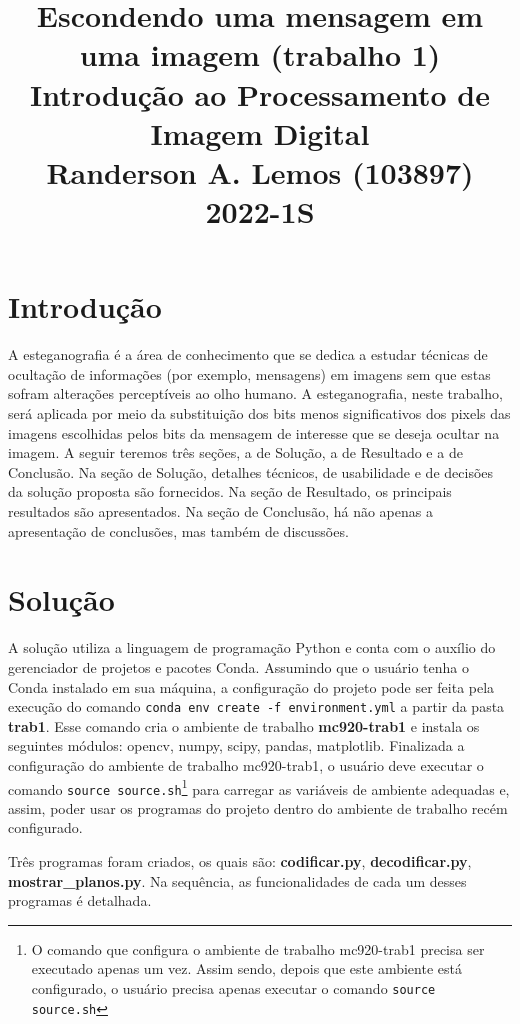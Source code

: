\documentclass{article}
\title{
	Escondendo uma mensagem em uma imagem (trabalho 1) \\
	\Large Introdução ao Processamento de Imagem Digital \\
	Randerson A. Lemos (103897)
	2022-1S
}
\date{\vspace{-5ex}}
\begin{document}
  \maketitle

\section{Introdução}
A esteganografia é a área de conhecimento que se dedica a estudar técnicas de ocultação de informações (por exemplo, mensagens) em imagens sem que estas sofram alterações perceptíveis ao olho humano. A esteganografia, neste trabalho, será aplicada por meio da substituição dos bits menos significativos dos pixels das imagens escolhidas pelos bits da mensagem de interesse que se deseja ocultar na imagem. A seguir teremos três seções, a de Solução, a de Resultado e a de Conclusão. Na seção de Solução, detalhes técnicos, de usabilidade e de decisões da solução proposta são fornecidos. Na seção de Resultado, os principais resultados são apresentados. Na seção de Conclusão, há não apenas a apresentação de conclusões, mas também de discussões.

\section{Solução}
A solução utiliza a linguagem de programação Python e conta com o auxílio do gerenciador de projetos e pacotes Conda. Assumindo que o usuário tenha o Conda instalado em sua máquina, a configuração do projeto pode ser feita pela execução do comando \lstinline{conda env create -f environment.yml} a partir da pasta \textbf{trab1}. Esse comando cria o ambiente de trabalho \textbf{mc920-trab1} e instala os seguintes módulos: opencv, numpy, scipy, pandas, matplotlib. Finalizada a configuração do ambiente de trabalho mc920-trab1, o usuário deve executar o comando \lstinline{source source.sh}\footnote{O comando que configura o ambiente de trabalho mc920-trab1 precisa ser executado apenas um vez. Assim sendo, depois que este ambiente está configurado, o usuário precisa apenas executar o comando \lstinline{source source.sh}} para carregar as variáveis de ambiente adequadas e, assim, poder usar os programas do projeto dentro do ambiente de trabalho recém configurado. 

Três programas foram criados, os quais são: \textbf{codificar.py}, \textbf{decodificar.py}, \textbf{mostrar\_planos.py}. Na sequência, as funcionalidades de cada um desses programas é detalhada.
\end{document}
